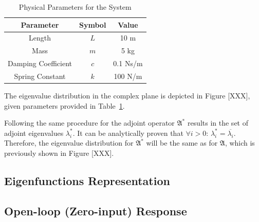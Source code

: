 \begin{table}[h!]
    \centering
    \caption{Physical Parameters for the System}
    \label{tab:pars}
    \begin{tabular}{|c|c|c|}
    \hline
    \textbf{Parameter} & \textbf{Symbol} & \textbf{Value} \\ \hline
    Length             & $L$             & 10 m           \\ \hline
    Mass               & $m$             & 5 kg           \\ \hline
    Damping Coefficient & $c$            & 0.1 Ns/m       \\ \hline
    Spring Constant    & $k$             & 100 N/m        \\ \hline
    \end{tabular}
    \end{table}

The eigenvalue distribution in the complex plane is depicted in Figure [XXX], given parameters provided in Table~\ref{tab:pars}.


Following the same procedure for the adjoint operator $\mathfrak{A}^*$ results in the set of adjoint eigenvalues $\lambda^*_i$. It can be analytically proven that $\forall i > 0$: $\lambda^*_i = \overline{\lambda_i}$. Therefore, the eigenvalue distribution for $\mathfrak{A}^*$ will be the same as for $\mathfrak{A}$, which is previously shown in Figure [XXX].


\subsection{Eigenfunctions Representation}

\subsection{Open-loop (Zero-input) Response}